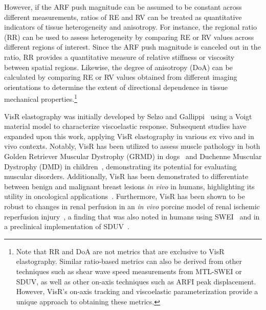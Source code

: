 However, if the ARF push magnitude can be assumed to be constant across different measurements, ratios of RE and RV can be treated as quantitative indicators of tissue heterogeneity and anisotropy. For instance, the regional ratio (RR) can be used to assess heterogeneity by comparing RE or RV values across different regions of interest. Since the ARF push magnitude is canceled out in the ratio, RR provides a quantitative measure of relative stiffness or viscosity between spatial regions. Likewise, the degree of anisotropy (DoA) can be calculated by comparing RE or RV values obtained from different imaging orientations to determine the extent of directional dependence in tissue mechanical properties.\footnote{
    Note that RR and DoA are not metrics that are exclusive to VisR elastography. Similar ratio-based metrics can also be derived from other techniques such as shear wave speed measurements from MTL-SWEI or SDUV, as well as other on-axis techniques such as ARFI peak displacement. However, VisR's on-axis tracking and viscoelastic parameterization provide a unique approach to obtaining these metrics.
} 


VisR elastography was initially developed by Selzo and Gallippi~\cite{selzo_Viscoelastic_2013} using a Voigt material model to characterize viscoelastic response. Subsequent studies have expanded upon this work, applying VisR elastography in various ex vivo and in vivo contexts. Notably, VisR has been utilized to assess muscle pathology in both Golden Retriever Muscular Dystrophy (GRMD) in dogs~\cite{moore_Computational_2018} and Duchenne Muscular Dystrophy (DMD) in children~\cite{moore_Vivo_2018}, demonstrating its potential for evaluating muscular disorders. Additionally, VisR has been demonstrated to differentiate between benign and malignant breast lesions \emph{in vivo} in humans, highlighting its utility in oncological applications~\cite{phillips_VisR_2025}. Furthermore, VisR has been shown to be robust to changes in renal perfusion in an \emph{in vivo} porcine model of renal ischemic reperfusion injury~\cite{hossain_Viscoelastic_2018}, a finding that was also noted in humans using SWEI~\cite{gao_Ultrasound_2020} and in a preclinical implementation of SDUV~\cite{amador_Shearwave_2011}.

